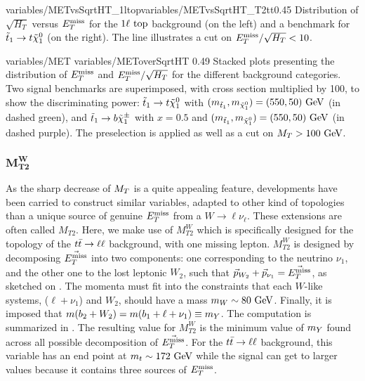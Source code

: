                      {variables/METvsSqrtHT_1ltop}{variables/METvsSqrtHT_T2tt}{0.45}
                     {Distribution of $\sqrt{H_T}$ versus $E_T^\text{miss}$ for the
                     $1\ell~\text{top}$ background (on the left) and a benchmark
                     for $\tilde{t}_1 \rightarrow t \tilde{\chi}_1^0$ (on the right).
                     The line illustrates a cut on $E_T^\text{miss} / \sqrt{H_T} < 10$.}

                     {variables/MET}
                     {variables/METoverSqrtHT}
                     {0.49}
                     {Stacked plots presenting the distribution of $E_T^\text{miss}$ and
                     $E_T^\text{miss} / \sqrt{H_T}$ for the different background
                     categories. Two signal benchmarks are superimposed, with
                     cross section multiplied by 100, to show the discriminating
                     power: $\tilde{t}_1 \rightarrow t \tilde{\chi}_1^0$ with
                     $(m_{\tilde{t}_1},m_{\tilde{\chi}_1^0}) = (550,50)~\text{GeV}$ (in
                     dashed green), and $\tilde{t}_1 \rightarrow b \tilde{\chi}_1^\pm$ with
                     $x = 0.5$ and $(m_{\tilde{t}_1}, m_{\tilde{\chi}_1^0}) =
                     (550,50)~\text{GeV}$ (in dashed purple). The preselection is
                     applied as well as a cut on $M_T > 100 ~\text{GeV}$.}

    \subsubsection{$\mathbf{M_{T2}^{W}}$}

    As the sharp decrease of $M_T$ is a quite appealing feature, developments
    have been carried \cite{MT2variables} to construct similar variables,
    adapted to other kind of topologies than a unique source of genuine $E_T^\text{miss}$
    from a $W \rightarrow \ell \nu_\ell$.  These extensions are often called
    $M_{T2}$. Here, we make use of $M_{T2}^W$ which is specifically designed for
    the topology of the $t\bar{t} \rightarrow \ell \ell$ background, with one missing lepton.
    $M_{T2}^W$ is designed by decomposing $\vec{E_T^\text{miss}}$ into two components: one
    corresponding to the neutrino $\nu_1$, and the other one to the lost
    leptonic $W_2$, such that $\vec{p}_{W_2} + \vec{p}_{\nu_1} = \vec{E_T^\text{miss}}$, as
    sketched on .  The momenta must fit into the constraints
    that each $W$-like systems, ($\ell + \nu_1$) and $W_2$, should have a mass
    $m_W \sim 80 ~\text{GeV}$. Finally, it is imposed that $m(b_2 + W_2) = m(b_1 + \ell
    + \nu_1) \equiv m_{Y}$. The computation is summarized in
    .  The resulting value for $M_{T2}^W$ is the
    minimum value of $m_{Y}$ found across all possible decomposition of
    $\vec{E_T^\text{miss}}$. For the $t\bar{t} \rightarrow \ell \ell$ background, this variable has an end
    point at $m_t \sim 172~\text{GeV}$ while the signal can get to larger values
    because it contains three sources of $E_T^\text{miss}$.

